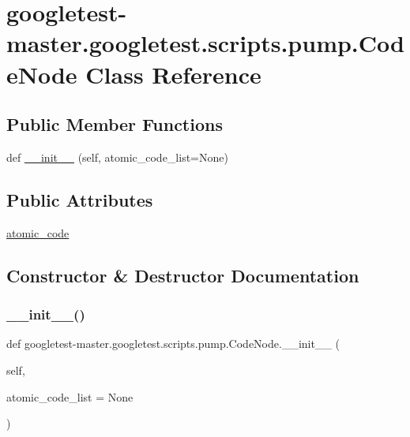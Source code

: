 \hypertarget{classgoogletest-master_1_1googletest_1_1scripts_1_1pump_1_1_code_node}{}\section{googletest-\/master.googletest.\+scripts.\+pump.\+Code\+Node Class Reference}
\label{classgoogletest-master_1_1googletest_1_1scripts_1_1pump_1_1_code_node}
\subsection*{Public Member Functions}
\begin{DoxyCompactItemize}
\item 
def \mbox{\hyperlink{classgoogletest-master_1_1googletest_1_1scripts_1_1pump_1_1_code_node_a190501fbef29ef5443d7426a505bd57e}{\+\_\+\+\_\+init\+\_\+\+\_\+}} (self, atomic\+\_\+code\+\_\+list=None)
\end{DoxyCompactItemize}
\subsection*{Public Attributes}
\begin{DoxyCompactItemize}
\item 
\mbox{\hyperlink{classgoogletest-master_1_1googletest_1_1scripts_1_1pump_1_1_code_node_a24aa96557627dd9dee828e0fa31f5a1e}{atomic\+\_\+code}}
\end{DoxyCompactItemize}


\subsection{Constructor \& Destructor Documentation}
\mbox{\label{classgoogletest-master_1_1googletest_1_1scripts_1_1pump_1_1_code_node_a190501fbef29ef5443d7426a505bd57e}} 
\subsubsection{\texorpdfstring{\_\_init\_\_()}{\_\_init\_\_()}}
{\footnotesize\ttfamily def googletest-\/master.\+googletest.\+scripts.\+pump.\+Code\+Node.\+\_\+\+\_\+init\+\_\+\+\_\+ (\begin{DoxyParamCaption}\item[{}]{self,  }\item[{}]{atomic\+\_\+code\+\_\+list = {\ttfamily None} }\end{DoxyParamCaption})}



